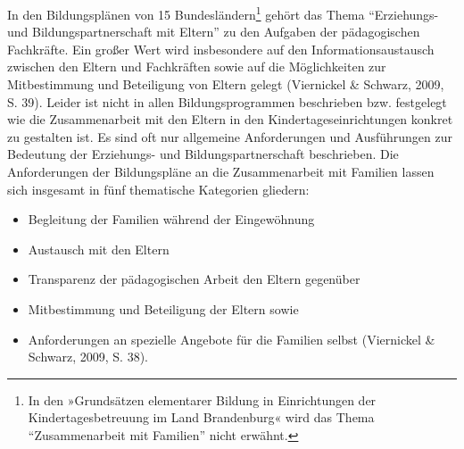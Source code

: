 \documentclass[12pt,a4paper]{article}
\begin{document}
In den Bildungsplänen von 15 Bundesländern\footnote{In den »Grundsätzen elementarer Bildung in Einrichtungen der Kindertagesbetreuung im Land Brandenburg« wird das Thema "`Zusammenarbeit mit Familien"' nicht erwähnt.} gehört das Thema "`Erziehungs- und Bildungspartnerschaft mit Eltern"' zu den Aufgaben der pädagogischen Fachkräfte. Ein großer Wert wird insbesondere auf den Informationsaustausch zwischen den Eltern und Fachkräften sowie auf die Möglichkeiten zur Mitbestimmung und Beteiligung von Eltern gelegt (Viernickel \& Schwarz, 2009, S. 39). Leider ist nicht in allen Bildungsprogrammen beschrieben bzw. festgelegt wie die Zusammenarbeit mit den Eltern in den Kindertageseinrichtungen konkret zu gestalten ist. Es sind oft nur allgemeine Anforderungen und Ausführungen zur Bedeutung der Erziehungs- und Bildungspartnerschaft beschrieben. Die Anforderungen der Bildungspläne an die Zusammenarbeit mit Familien lassen sich insgesamt in fünf thematische Kategorien gliedern:
\begin{itemize}
\item Begleitung der Familien während der Eingewöhnung
\item Austausch mit den Eltern  
\item Transparenz der  pädagogischen Arbeit den Eltern gegenüber
\item Mitbestimmung und Beteiligung der Eltern sowie
\item Anforderungen an spezielle Angebote für die Familien selbst (Viernickel \& Schwarz, 2009, S. 38).
\end{itemize}
		
\end{document}
